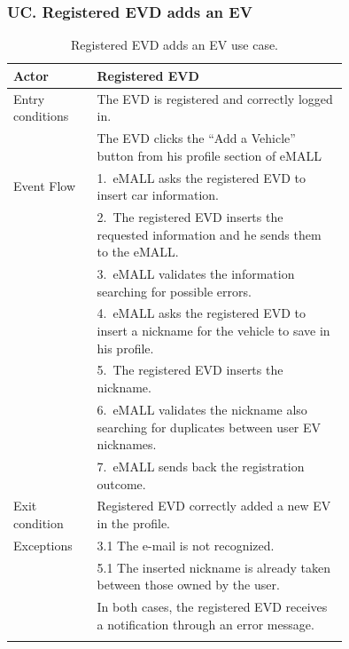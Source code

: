 \subsubsection*{UC\cuc . Registered EVD adds an EV}
\begin{center}
    \begin{longtable}{lp{0.75\linewidth}}
        \hline
        Actor            & Registered EVD                                                                                 \\
        \hline
        Entry conditions & The EVD is registered and correctly logged in.                                                 \\
        & The EVD clicks the ``Add a Vehicle'' button from his profile section of eMALL                  \\
        \hline
        Event Flow       & 1.\ eMALL asks the registered EVD to insert car information.                                   \\
        & 2.\ The registered EVD inserts the requested information and he sends them to the eMALL.       \\
        & 3.\ eMALL validates the information searching for possible errors.                             \\
        & 4.\ eMALL asks the registered EVD to insert a nickname for the vehicle to save in his profile. \\
        & 5.\ The registered EVD inserts the nickname.                                                   \\
        & 6.\ eMALL validates the nickname also searching for duplicates between user EV nicknames.      \\
        & 7.\ eMALL sends back the registration outcome.                                                 \\
        \hline
        Exit condition   & Registered EVD correctly added a new EV in the profile.                                        \\
        \hline
        Exceptions       & 3.1 The e-mail is not recognized.                                                              \\
        & 5.1 The inserted nickname is already taken between those owned by the user.                    \\
        & In both cases, the registered EVD receives a notification through an error message.            \\
        \hline
        \caption{Registered EVD adds an EV use case.}
        \label{tab: EVD_adds_a_vehicle_use_case}
    \end{longtable}


\end{center}
